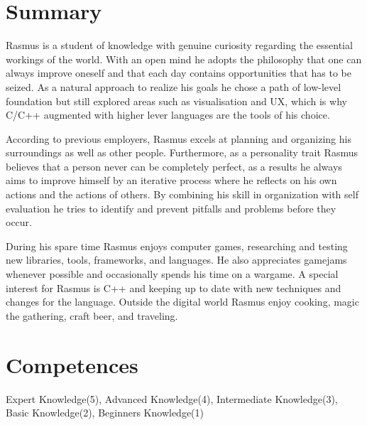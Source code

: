 \documentclass[a4paper, 11pt]{article}
\begin{document}
\section{Summary}
Rasmus is a student of knowledge with genuine curiosity regarding the essential workings of the world. With an open mind he adopts the philosophy that one can always improve oneself and that each day contains opportunities that has to be seized. As a natural approach to realize his goals he chose a path of low-level foundation but still explored areas such as visualisation and UX, which is why C/C++ augmented with higher lever languages are the tools of his choice.

According to previous employers, Rasmus excels at planning and organizing his surroundings as well as other people. Furthermore, as a personality trait Rasmus believes that a person never can be completely perfect, as a results he always aims to improve himself by an iterative process where he reflects on his own actions and the actions of others. By combining his skill in organization with self evaluation he tries to identify and prevent pitfalls and problems before they occur.

During his spare time Rasmus enjoys computer games, researching and testing new libraries, tools, frameworks, and languages. He also appreciates gamejams whenever possible and occasionally spends his time on a wargame. A special interest for Rasmus is C++ and keeping up to date with new techniques and changes for the language. Outside the digital world Rasmus enjoy cooking, magic the gathering, craft beer, and traveling.

\section{Competences}
Expert Knowledge(5), Advanced Knowledge(4), Intermediate Knowledge(3), Basic Knowledge(2), Beginners Knowledge(1)
\end{document}
